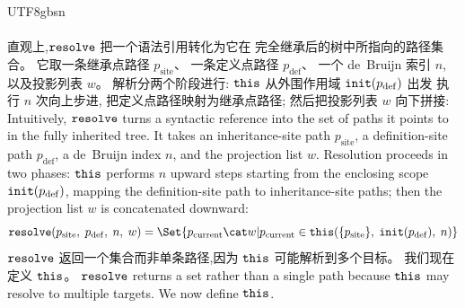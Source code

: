 \begin{CJK*}{UTF8}{gbsn}
\paragraph{}
\ifPaperChinese
直观上,$\mathtt{resolve}$ 把一个语法引用转化为它在
完全继承后的树中所指向的路径集合。
它取一条继承点路径 $p_{\mathrm{site}}$、
一条定义点路径 $p_{\mathrm{def}}$、
一个 de~Bruijn 索引 $n$,
以及投影列表 $w$。
解析分两个阶段进行:
$\mathtt{this}$ 从外围作用域 $\mathtt{init}(p_{\mathrm{def}})$ 出发
执行 $n$ 次向上步进,
把定义点路径映射为继承点路径;
然后把投影列表 $w$ 向下拼接:
\else
Intuitively, $\mathtt{resolve}$ turns a syntactic reference into the
set of paths it points to in the fully inherited tree.
It takes an inheritance-site path $p_{\mathrm{site}}$,
a definition-site path $p_{\mathrm{def}}$,
a de~Bruijn index $n$,
and the projection list $w$.
Resolution proceeds in two phases:
$\mathtt{this}$ performs $n$ upward steps
starting from the enclosing scope $\mathtt{init}(p_{\mathrm{def}})$,
mapping the definition-site path to inheritance-site paths;
then the projection list $w$ is concatenated downward:
\fi
\begin{equation}\label{eq:resolve}
  \resolve(p_{\mathrm{site}},\; p_{\mathrm{def}},\; n,\; w)
  = \Set{
    p_{\mathrm{current}} \cat w
    |
    p_{\mathrm{current}} \in
    \this(\{p_{\mathrm{site}}\},\; \init(p_{\mathrm{def}}),\; n)
  }
\end{equation}
\ifPaperChinese
$\mathtt{resolve}$ 返回一个集合而非单条路径,因为
$\mathtt{this}$ 可能解析到多个目标。
我们现在定义 $\mathtt{this}$。
\else
$\mathtt{resolve}$ returns a set rather than a single path because
$\mathtt{this}$ may resolve to multiple targets.
We now define $\mathtt{this}$.
\fi


\end{CJK*}
